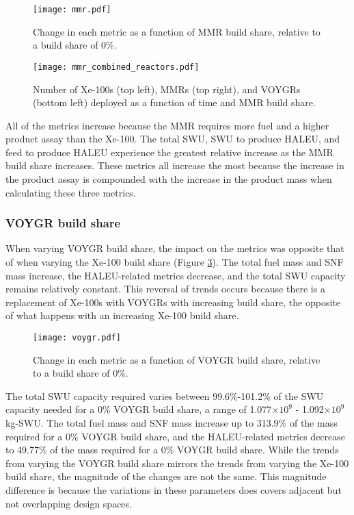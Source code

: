\begin{figure}
    \centering
    \texttt{[image: mmr.pdf]}
    \caption{Change in each metric as a function of MMR build share, 
    relative to a build share of 0\%.}
    \label{fig:mmr_scenario7}
\end{figure}


\begin{figure}
    \centering
    \texttt{[image: mmr\_combined\_reactors.pdf]}
    \caption{Number of Xe-100s (top left), MMRs (top right), and 
    VOYGRs (bottom left) deployed as a function of time and 
    MMR build share.}
    \label{fig:mmr_reactors_s7}
\end{figure}

All of the metrics increase because the \gls{MMR} requires more fuel and 
a higher product assay than the Xe-100. 
The total \gls{SWU}, \gls{SWU} to produce \gls{HALEU}, and feed to 
produce \gls{HALEU} experience the greatest relative increase as the 
\gls{MMR} build share increases. These metrics all increase the most 
because the increase in the product assay is compounded with the increase 
in the product mass when calculating these three metrics. 


\subsubsection{VOYGR build share}
When varying VOYGR build share, the impact on the metrics was 
opposite that of when varying the Xe-100 build share (Figure 
\ref{fig:voygr_scenario7}). The total fuel mass and \gls{SNF} mass 
increase, the \gls{HALEU}-related metrics decrease, and the total 
\gls{SWU} capacity remains relatively constant. This reversal 
of trends occurs because there is a replacement of Xe-100s with VOYGRs
with increasing build share, 
the opposite of what happens with an increasing Xe-100 build share. 

\begin{figure}
    \centering
    \texttt{[image: voygr.pdf]}
    \caption{Change in each metric as a function of VOYGR build share, 
    relative to a build share of 0\%.}
    \label{fig:voygr_scenario7}
\end{figure}

The total \gls{SWU} capacity required varies between 99.6\%-101.2\% of the 
\gls{SWU} capacity needed for a 0\% VOYGR build share, a range of 1.077$\times 10^9$
- 1.092$\times 10^9$ kg-SWU. The total fuel mass and \gls{SNF} mass increase 
up to 313.9\% of the mass required for a 0\% VOYGR build share, and the 
\gls{HALEU}-related metrics decrease to 49.77\% of the mass required 
for a 0\% VOYGR build share. While the trends from varying the VOYGR build share 
mirrors the trends from varying the Xe-100 build share, the magnitude of the 
changes are not the same. This magnitude difference is because the variations 
in these parameters does covers adjacent but not overlapping design spaces. 

